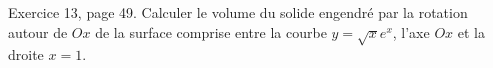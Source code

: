 \begin{exercice}\label{exoGeneral0025}

Exercice 13, page 49. Calculer le volume du solide engendré par la rotation autour de $Ox$ de la surface comprise entre la courbe $y=\sqrt{x} e^{x}$, l'axe $Ox$ et la droite $x=1$.

\end{exercice}
